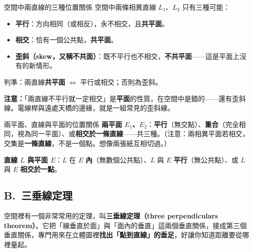 \documentclass[11pt]{article}
\begin{document}
\begin{補充框}{空間中兩直線的三種位置關係}
空間中兩條相異直線 $L_1$、$L_2$ 只有三種可能：
\begin{itemize}\setlength{\itemsep}{1pt}
\item \textbf{平行}：方向相同（或相反），永不相交，且\textbf{共平面}。
\item \textbf{相交}：恰有一個公共點，\textbf{共平面}。
\item \textbf{歪斜（skew，又稱不共面）}：既不平行也不相交，\textbf{不共平面}——這是平面上沒有的新情形。
\end{itemize}
判準：兩直線\textbf{共平面} $\iff$ 平行或相交；否則為歪斜。

\textbf{注意：}「兩直線不平行就一定相交」是\textbf{平面}的性質，在空間中是錯的——還有歪斜線。電線桿與遠處天橋的邊緣，就是一組常見的歪斜線。
\end{補充框}


\begin{補充框}{兩平面、直線與平面的位置關係}
\textbf{兩平面 $E_1$、$E_2$}：\textbf{平行}（無交點）、\textbf{重合}（完全相同，視為同一平面）、或\textbf{相交於一條直線}——共三種。（注意：兩相異平面若相交，交集是\textbf{一條直線}，不是一個點。想像兩張紙互相切過。）

\textbf{直線 $L$ 與平面 $E$}：$L$ 在 $E$ \textbf{內}（無數個公共點）、$L$ 與 $E$ \textbf{平行}（無公共點）、或 $L$ 與 $E$ \textbf{相交於一點}。
\end{補充框}

\subsection*{\sffamily B.\ 三垂線定理}

空間裡有一個非常常用的定理，叫\textbf{三垂線定理（three perpendiculars theorem）}。它把「線垂直於面」與「面內的垂直」這兩個垂直關係，接成第三個垂直關係，專門用來在立體圖裡\textbf{找出「點到直線」的垂足}，好讓你知道距離要從哪裡量起。
\end{document}
